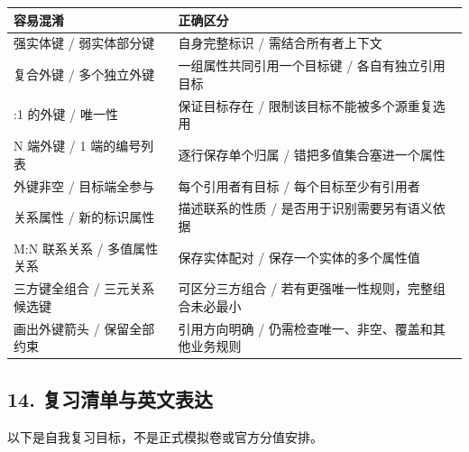 \begin{longtable}[]{@{}
  >{\raggedright\arraybackslash}p{}
  >{\raggedright\arraybackslash}p{}@{}}
\toprule\noalign{}
\begin{minipage}[b]{\linewidth}\raggedright
容易混淆
\end{minipage} & \begin{minipage}[b]{\linewidth}\raggedright
正确区分
\end{minipage} \\
\midrule\noalign{}
\endhead
\bottomrule\noalign{}
\endlastfoot
强实体键 / 弱实体部分键 & 自身完整标识 / 需结合所有者上下文 \\
复合外键 / 多个独立外键 & 一组属性共同引用一个目标键 / 各自有独立引用目标 \\
1:1 的外键 / 唯一性 & 保证目标存在 / 限制该目标不能被多个源重复选用 \\
N 端外键 / 1 端的编号列表 & 逐行保存单个归属 / 错把多值集合塞进一个属性 \\
外键非空 / 目标端全参与 & 每个引用者有目标 / 每个目标至少有引用者 \\
关系属性 / 新的标识属性 & 描述联系的性质 / 是否用于识别需要另有语义依据 \\
M:N 联系关系 / 多值属性关系 & 保存实体配对 / 保存一个实体的多个属性值 \\
三方键全组合 / 三元关系候选键 & 可区分三方组合 / 若有更强唯一性规则，完整组合未必最小 \\
画出外键箭头 / 保留全部约束 & 引用方向明确 / 仍需检查唯一、非空、覆盖和其他业务规则 \\
\end{longtable}

\subsection{14. 复习清单与英文表达}\label{04_er_to_relational_mapping_zh-ux590dux4e60ux6e05ux5355ux4e0eux82f1ux6587ux8868ux8fbe}

以下是自我复习目标，不是正式模拟卷或官方分值安排。

